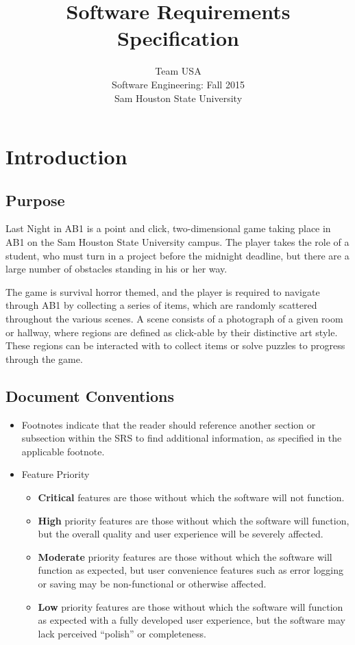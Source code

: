 \documentclass{article}
\title{Software Requirements Specification}
\author{Team USA\\ Software Engineering: Fall 2015\\ Sam Houston State University}
\begin{document}
\maketitle
\newpage

\tableofcontents
\newpage

\section{Introduction}
	\subsection{Purpose}
		Last Night in AB1 is a point and click, two-dimensional game taking place in AB1 on the Sam Houston State University campus. The player takes the role of a student, who must turn in a project before the midnight deadline, but there are a large number of obstacles standing in his or her way. 
		
		The game is survival horror themed, and the player is required to navigate through AB1 by collecting a series of items, which are randomly scattered throughout the various scenes. A scene consists of a photograph of a given room or hallway, where regions are defined as click-able by their distinctive art style. These regions can be interacted with to collect items or solve puzzles to progress through the game.
	
	\subsection{Document Conventions}
		\begin{itemize}
			\item Footnotes indicate that the reader should reference another section or subsection within the SRS to find additional information, as specified in the applicable footnote.
			\item Feature Priority
			\begin{itemize}
				\item \textbf{Critical} features are those without which the software will not function. 
				\item \textbf{High} priority features are those without which the software will function, but the overall quality and user experience will be severely affected. 
				\item \textbf{Moderate} priority features are those without which the software will function as expected, but user convenience features such as error logging or saving may be non-functional or otherwise affected. 
				\item \textbf{Low} priority features are those without which the software will function as expected with a fully developed user experience, but the software may lack perceived ``polish'' or completeness. 
			\end{itemize}
		\end{itemize}
	
\end{document}
